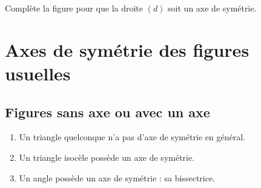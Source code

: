 \documentclass[a4paper,10pt]{report}
\begin{document}
\begin{ex}
Complète la figure pour que la droite $(d)$ soit un axe de symétrie.

\smallskip
\noindent\begin{minipage}{0.48\linewidth}
\begin{center}
\end{center}
\end{minipage}
\hfill
\begin{minipage}{0.48\linewidth}
\grandscarreaux{\linewidth}{3.35cm}
\end{minipage}
\end{ex}

\section{Axes de symétrie des figures usuelles}

\subsection{Figures sans axe ou avec un axe}
\enlargethispage{4cm}

\begin{prop}
\begin{enumerate}
\item[•] Un triangle quelconque n'a pas d'axe de symétrie en général.
\item[•] Un triangle isocèle possède un axe de symétrie.
\item[•] Un angle possède un axe de symétrie : sa bissectrice.
\end{enumerate}
\end{prop}
\end{document}
